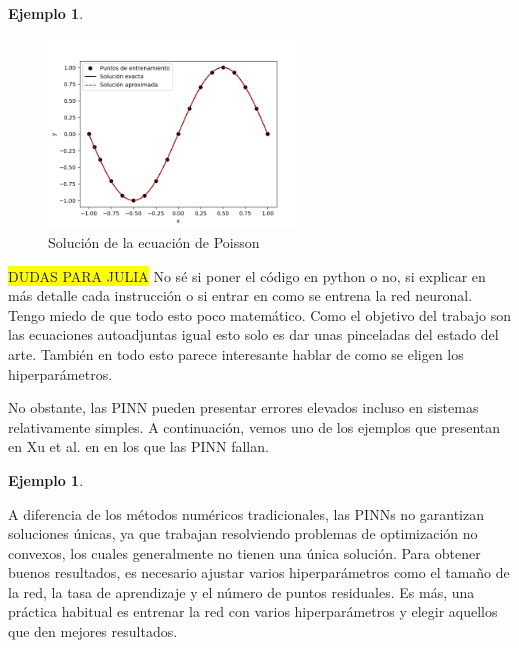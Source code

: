 \documentclass[a4paper,11pt,spanish, twoside, leqno]{tfg-uam}
\theoremstyle{definition}
\newtheorem{exmp}[teor]{Ejemplo}
\begin{document}
\begin{mdframed}
\begin{exmp}
    \begin{figure}[H] 
        \centering
        \includegraphics[width=0.6\textwidth]{Figuras/Poisson.png}
        \caption{Solución de la ecuación de Poisson}
        \label{fig:poisson_PINN}
    \end{figure}

    \colorbox{yellow}{DUDAS PARA JULIA}
    No sé si poner el código en python o no, si explicar en más detalle cada instrucción o si entrar en como se entrena la red neuronal. Tengo miedo de que todo esto poco matemático. Como el objetivo del trabajo son las ecuaciones autoadjuntas igual esto solo es dar unas pinceladas del estado del arte. También en todo esto parece interesante hablar de como se eligen los hiperparámetros.

\end{exmp}

    
\end{mdframed}

No obstante, las PINN pueden presentar errores elevados incluso en sistemas relativamente simples. A continuación, vemos uno de los ejemplos que presentan en Xu et al. en \cite{krishnapriyan2021characterizingpossiblefailuremodes} en los que las PINN fallan.

\begin{mdframed}
    \begin{exmp}
        
    \end{exmp}
\end{mdframed}
A diferencia de los métodos numéricos tradicionales, las PINNs no garantizan soluciones únicas, ya que trabajan resolviendo problemas de optimización no convexos, los cuales generalmente no tienen una única solución. Para obtener buenos resultados, es necesario ajustar varios hiperparámetros como el tamaño de la red, la tasa de aprendizaje y el número de puntos residuales. Es más, una práctica habitual es entrenar la red con varios hiperparámetros y elegir aquellos que den mejores resultados.
\end{document}

